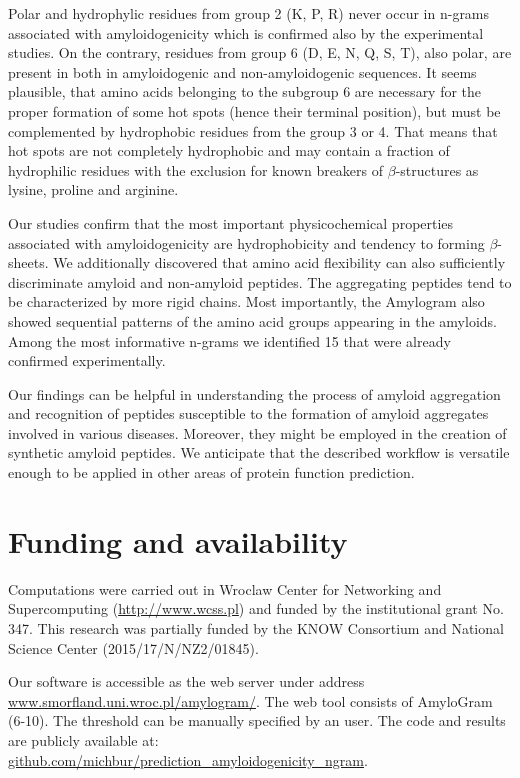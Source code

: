 \documentclass[fleqn,10pt,twoside]{gcb15submission}
\begin{document}
  Polar and hydrophylic residues from group 2 (K, P, R) never occur in n-grams 
associated with amyloidogenicity which is confirmed also by the experimental 
studies. On the contrary, residues from group 6 (D, E, N, Q, S, T), also polar, 
are present in both in amyloidogenic and non-amyloidogenic sequences. It seems 
plausible, that amino acids belonging to the subgroup 6 are necessary for the 
proper formation of some hot spots (hence their terminal position), but must be 
complemented by hydrophobic residues from the group 3 or 4. That means that hot 
spots are not completely hydrophobic and may contain a fraction of hydrophilic 
residues with the exclusion for known breakers of $\beta$-structures as lysine, 
proline and arginine.

  Our studies confirm that the most important physicochemical properties 
associated with amyloidogenicity are hydrophobicity and tendency to forming 
$\beta$-sheets.  We additionally discovered that amino acid flexibility can also 
sufficiently discriminate amyloid and non-amyloid peptides. The aggregating 
peptides tend to be characterized by more rigid chains. Most importantly, the 
Amylogram also showed sequential patterns of the amino acid groups appearing in 
the amyloids. Among the most informative n-grams we identified 15 that were 
already confirmed experimentally. 

  Our findings can be helpful in understanding the process of amyloid 
aggregation and recognition of peptides susceptible to the formation of amyloid 
aggregates involved in various diseases. Moreover, they might be employed in the 
creation of synthetic amyloid peptides. We anticipate that the described 
workflow is versatile enough to be applied in other areas of protein function 
prediction.

\section*{Funding and availability}

Computations were carried out in Wroclaw Center for Networking and 
Supercomputing (\url{http://www.wcss.pl}) and funded by the institutional grant 
No. 347. This research was partially funded by the KNOW Consortium and National 
Science Center (2015/17/N/NZ2/01845).

  Our software is accessible as the web server under address 
\url{www.smorfland.uni.wroc.pl/amylogram/}. The web tool consists of AmyloGram 
(6-10). The threshold can be manually specified by an user. The code and 
results are publicly available at: 
\url{github.com/michbur/prediction_amyloidogenicity_ngram}.


\end{document}

